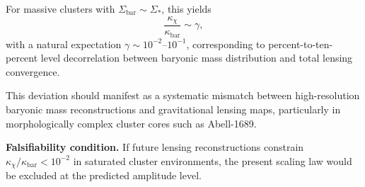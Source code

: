     For massive clusters with
    $\Sigma_{\mathrm{bar}} \sim \Sigma_*$,
    this yields
    \begin{equation}
      \frac{\kappa_{\chi}}{\kappa_{\mathrm{bar}}}
      \sim \gamma ,
    \end{equation}
    with a natural expectation
    $\gamma \sim 10^{-2} \text{--} 10^{-1}$,
    corresponding to percent-to-ten-percent level decorrelation
    between baryonic mass distribution and total lensing convergence.

    This deviation should manifest as a systematic mismatch between
    high-resolution baryonic mass reconstructions and gravitational
    lensing maps, particularly in morphologically complex cluster cores
    such as Abell-1689.

    \textbf{Falsifiability condition.}
    If future lensing reconstructions constrain
    $\kappa_{\chi}/\kappa_{\mathrm{bar}} < 10^{-2}$
    in saturated cluster environments, the present scaling law
    would be excluded at the predicted amplitude level.
